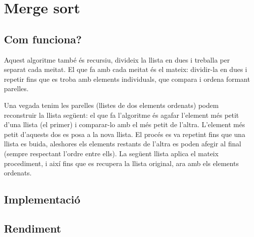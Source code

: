 \chapter{Merge sort}

\section{Com funciona?}
Aquest algoritme també és recursiu, divideix la llista en dues i treballa per separat cada meitat. El que fa amb cada meitat és el mateix: dividir-la en dues i repetir fins que es troba amb elements individuals, que compara i ordena formant parelles.

Una vegada tenim les parelles (llistes de dos elements ordenats) podem reconstruir la llista següent: el que fa l'algoritme és agafar l'element més petit d'una llista (el primer) i comparar-lo amb el més petit de l'altra. L'element més petit d'aquests dos es posa a la nova llista. El procés es va repetint fins que una llista es buida, aleshores els elements restants de l'altra es poden afegir al final (sempre respectant l'ordre entre ells).
La següent llista aplica el mateix procediment, i així fins que es recupera la llista original, ara amb els elements ordenats.

\section{Implementació}

\vspace{1em}

\begin{minipage}{\textwidth}
	\section{Rendiment}
	\noindent
	\makebox[\textwidth][c]{
		
	}
	\vspace*{1em}
	\begin{center}
		\resizebox{\textwidth}{!}{}
	\end{center}
\end{minipage}